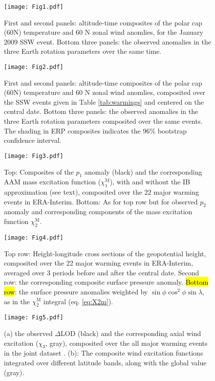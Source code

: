 \documentclass[draft,jgrga]{agutex}
\begin{document}
\begin{figure} 
\texttt{[image: Fig1.pdf]} 
   \caption{First and second panels: altitude-time composites of the polar cap (60\degree N) temperature and 60 \degree N zonal wind anomlies, for the January 2009 SSW event.  Bottom three panels: the observed anomalies in the three Earth rotation parameters over the same time. }  
   \label{fig:2009event}
 \end{figure}


\begin{figure} 
\texttt{[image: Fig2.pdf]}
   \caption{First and second panels: altitude-time composites of the polar cap (60\degree N) temperature and 60 \degree N zonal wind anomlies, composited over the SSW events given in Table \ref{tab:warmings} and centered on the central date.  Bottom three panels: the observed anomalies in the three Earth rotation parameters composited over the same events.  The shading in ERP composites indicates the 96$\%$ bootstrap confidence interval.}
   \label{fig:summary}
 \end{figure}

\begin{figure}
  \noindent
  \texttt{[image: Fig3.pdf]} 
   \caption{Top: Composites of the $p_1$ anomaly (black) and the corresponding AAM mass excitation function  ($\chi_1^{\text{M}}$), with and without the IB approximation (see text), composited over  {the 22 major warming events in ERA-Interim}.   Bottom: As for top row but for observed $p_2$ anomaly and corresponding components of the mass excitation function $\chi_2^{\text{M}}$.}
   \label{fig:composites_X12}
 \end{figure}


\begin{figure}
  \noindent
 \texttt{[image: Fig4.pdf]}
   \caption{Top row: Height-longitude cross sections of the geopotential height, composited over  {the 22 major warming events in ERA-Interim},  averaged over 3 periods before and after the central date.  Second row: the corresponding composite surface pressure anomaly.  \hl{Bottom row}: the surface pressure anomalies weighted by  $\sin \phi \cos^2 \phi \sin \lambda$, as in the $\chi_2^{\text{M}}$ integral (eq. \ref{eq:X2m}).
}
   \label{fig:EGPH_mass_aam}
 \end{figure}

 
\begin{figure}
  \noindent
  \texttt{[image: Fig5.pdf]} 
   \caption{ (a) the observed $\Delta$LOD (black) and the corresponding axial wind excitation ($\chi_3$, gray), composited over  {the all major warming events in the joint dataset} . (b): The composite wind excitation functions integrated over different latitude bands, along with the global value (gray). }
   \label{fig:composites_X3}
 \end{figure}
\end{document}

